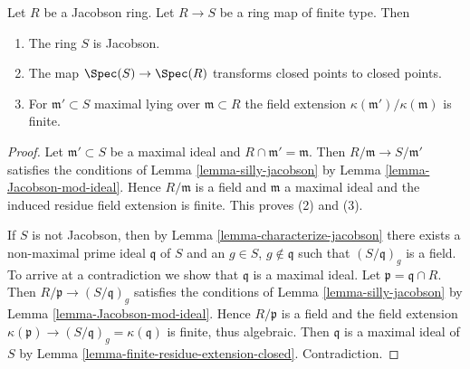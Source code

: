 \begin{proposition}
\label{proposition-Jacobson-permanence}
Let $R$ be a Jacobson ring. Let $R \to S$ be a
ring map of finite type. Then
\begin{enumerate}
\item The ring $S$ is Jacobson.
\item The map $\Spec(S) \to \Spec(R)$ transforms
closed points to closed points.
\item For $\mathfrak m' \subset S$ maximal lying over $\mathfrak m \subset R$
the field extension $\kappa(\mathfrak m')/\kappa(\mathfrak m)$
is finite.
\end{enumerate}
\end{proposition}

\begin{proof}
Let $\mathfrak m' \subset S$ be a maximal ideal and
$R \cap \mathfrak m' = \mathfrak m$.
Then $R/\mathfrak m \to S/\mathfrak m'$ satisfies
the conditions of Lemma \ref{lemma-silly-jacobson}
by Lemma \ref{lemma-Jacobson-mod-ideal}.
Hence $R/\mathfrak m$ is a field and
$\mathfrak m$ a maximal ideal and the induced
residue field extension is finite. This proves (2) and (3).  

\medskip\noindent
If $S$ is not Jacobson, then by Lemma \ref{lemma-characterize-jacobson} there
exists a non-maximal prime ideal $\mathfrak q$ of $S$ and an
$g \in S$, $g \not\in \mathfrak q$ such that $(S/\mathfrak q)_g$ is a field.
To arrive at a contradiction we show that $\mathfrak q$ is a maximal ideal.
Let $\mathfrak p = \mathfrak q \cap R$. Then
$R/\mathfrak p \to (S/\mathfrak q)_g$ satisfies the conditions of
Lemma \ref{lemma-silly-jacobson} by
Lemma \ref{lemma-Jacobson-mod-ideal}.
Hence $R/\mathfrak p$ is a field and the field extension
$\kappa(\mathfrak p) \to (S/\mathfrak q)_g = \kappa(\mathfrak q)$ is
finite, thus algebraic. Then $\mathfrak q$ is a maximal ideal of $S$ by
Lemma \ref{lemma-finite-residue-extension-closed}. Contradiction.
\end{proof}